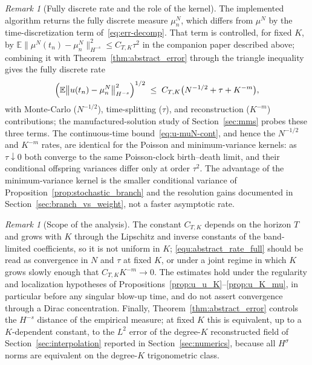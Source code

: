 \documentclass[a4paper,fleqn]{cas-sc}
\theoremstyle{definition}
\theoremstyle{remark}
\newtheorem{remark}[theorem]{Remark}
\begin{document}
\begin{remark}[Fully discrete rate and the role of the kernel]\label{rem:rate}
The implemented algorithm returns the fully discrete measure $\mu^N_n$, which
differs from $\mu^N$ by the time-discretization term of~\eqref{eq:err-decomp}. That
term is controlled, for fixed $K$, by $\mathbb E\|\mu^N(t_n)-\mu^N_n\|_{H^{-s}}^2\le
C_{T,K}\tau^2$ in the companion paper described above; combining it with
Theorem~\ref{thm:abstract_error} through the triangle inequality gives the fully
discrete rate
\begin{equation}\label{equ:abstract_rate_full}
\Bigl(\mathbb E\bigl\|u(t_n)-\mu^N_n\bigr\|_{H^{-s}}^2\Bigr)^{1/2}
\;\le\; C_{T,K}\bigl(N^{-1/2}+\tau+K^{-m}\bigr),
\end{equation}
with Monte-Carlo ($N^{-1/2}$), time-splitting ($\tau$), and reconstruction
($K^{-m}$) contributions; the manufactured-solution study of Section~\ref{sec:mms}
probes these three terms. The continuous-time bound~\eqref{eq:u-muN-cont}, and hence
the $N^{-1/2}$ and $K^{-m}$ rates, are identical for the Poisson and
minimum-variance kernels: as $\tau\downarrow0$ both converge to the same
Poisson-clock birth--death limit, and their conditional offspring variances differ
only at order $\tau^2$. The advantage of the minimum-variance kernel is the smaller
conditional variance of Proposition~\ref{prop:stochastic_branch} and the resolution
gains documented in Section~\ref{sec:branch_vs_weight}, not a faster asymptotic
rate.
\end{remark}

\begin{remark}[Scope of the analysis]\label{rem:scope}
The constant $C_{T,K}$ depends on the horizon $T$ and grows with $K$ through the
Lipschitz and inverse constants of the band-limited coefficients, so it is not
uniform in $K$; \eqref{equ:abstract_rate_full} should be read as convergence in $N$
and $\tau$ at fixed $K$, or under a joint regime in which $K$ grows slowly enough
that $C_{T,K}K^{-m}\to0$. The estimates hold under the regularity and localization
hypotheses of Propositions~\ref{prop:u_u_K}--\ref{prop:u_K_mu}, in particular before
any singular blow-up time, and do not assert convergence through a Dirac
concentration. Finally, Theorem~\ref{thm:abstract_error} controls the $H^{-s}$
distance of the empirical measure; at fixed $K$ this is equivalent, up to a
$K$-dependent constant, to the $L^2$ error of the degree-$K$ reconstructed field of
Section~\ref{sec:interpolation} reported in Section~\ref{sec:numerics}, because all
$H^\sigma$ norms are equivalent on the degree-$K$ trigonometric class.
\end{remark}
\end{document}
